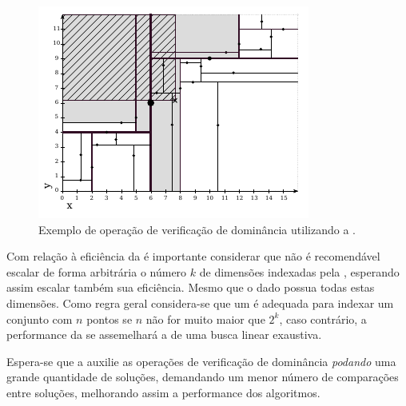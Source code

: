 \begin{figure}
  \centering
  \includegraphics[scale=1.7]{img/kdt/query}
  \caption{Exemplo de operação de verificação de dominância utilizando a \kdtree{}.}
  \label{fig:query}
\end{figure}

Com relação à eficiência da \kdtree{} é importante considerar que não é
recomendável escalar de forma arbitrária o número $k$ de dimensões
indexadas pela \kdtree{}, esperando assim escalar também sua eficiência.
Mesmo que o dado possua todas estas dimensões.
Como regra geral considera-se que um \kdtree{} é adequada para indexar um
conjunto com $n$ pontos se $n$ não for muito maior que $2^k$\cite{toth2004handbook},
caso contrário, a performance da \kdtree{} se assemelhará a de uma busca
linear exaustiva.

Espera-se que a \kdtree{} auxilie as operações de verificação de dominância
\emph{podando} uma grande quantidade de soluções, demandando um menor número
de comparações entre soluções, melhorando assim a performance dos algoritmos.


